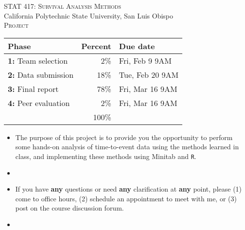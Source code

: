 \documentclass[letterpaper,12pt]{report}
\begin{document}
\begin{center}
\large{\textsc{STAT 417: Survival Analysis Methods}}\\
California Polytechnic State University, San Luis Obispo\\
\vskip10pt
\large{\textsc{Project}}
\end{center}

\vskip10pt
\begin{center}
{\renewcommand{\arraystretch}{1.1}
\begin{tabular}{lrl}
\hline
Phase & Percent & Due date \\
\hline\hline
\textbf{1:} Team selection      & 2\%  & Fri, Feb 9 9AM\\
\textbf{2:} Data submission     & 18\% & Tue, Feb 20 9AM\\
\textbf{3:} Final report        & 78\% & Fri, Mar 16 9AM\\
\textbf{4:} Peer evaluation     & 2\%  & Fri, Mar 16 9AM\\
\hline
 & 100\% & \\
\end{tabular}}
\end{center}


\begin{itemize}
    \item[] The purpose of this project is to provide you the opportunity to perform some hands-on analysis of time-to-event data using the methods learned in class, and implementing these methods using Minitab and \texttt{R}.
    \item[]
\end{itemize}


\begin{itemize}
    \item[] If you have \textbf{any} questions or need \textbf{any} clarification at \textbf{any} point, please (1) come to office hours, (2) schedule an appointment to meet with me, or (3) post on the course discussion forum.
    \item[]
\end{itemize}
\end{document}
